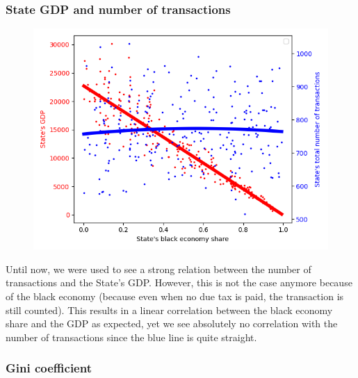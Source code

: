 {{{{{{{{{{            
        \subsubsection{State GDP and number of transactions}

        \begin{figure}
            \includegraphics[width=\linewidth]{img/exp/7_1.png}
        \end{figure} 
        {Until now, we were used to see a strong relation between the number of transactions and the State's GDP. However, this is not the case anymore because of the black economy (because even when no due tax is paid, the transaction is still counted). This results in a linear correlation between the black economy share and the GDP as expected, yet we see absolutely no correlation with the number of transactions since the blue line is quite straight.
        \par

        \subsubsection{Gini coefficient}

}}}}}}}}}}}
